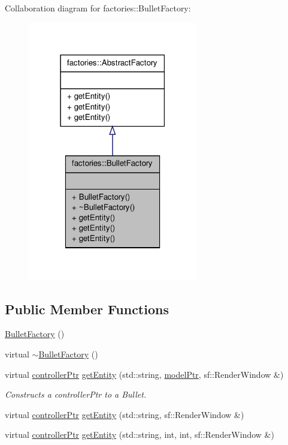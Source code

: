 \-Collaboration diagram for factories\-:\-:\-Bullet\-Factory\-:\nopagebreak
\begin{figure}[H]
\begin{center}
\leavevmode
\includegraphics[width=210pt]{da/ddc/classfactories_1_1BulletFactory__coll__graph}
\end{center}
\end{figure}
\subsection*{\-Public \-Member \-Functions}
\begin{DoxyCompactItemize}
\item 
\hyperlink{classfactories_1_1BulletFactory_a5af74b507fc4f0fe39fb94efbf159a5c}{\-Bullet\-Factory} ()
\item 
virtual \hyperlink{classfactories_1_1BulletFactory_a789745f38774d8a97593881eb3f42405}{$\sim$\-Bullet\-Factory} ()
\item 
virtual \hyperlink{Game_8h_a21b04f6cf2d5990b82725fac5ea2ce9a}{controller\-Ptr} \hyperlink{classfactories_1_1BulletFactory_a52d80d4c23a55808219029ae7ad898a4}{get\-Entity} (std\-::string, \hyperlink{ModelView_8h_a78966ddb517fca8d2b29a2bc5c31e74e}{model\-Ptr}, sf\-::\-Render\-Window \&)
\begin{DoxyCompactList}\small\item\em \-Constructs a controller\-Ptr to a \-Bullet. \end{DoxyCompactList}\item 
virtual \hyperlink{Game_8h_a21b04f6cf2d5990b82725fac5ea2ce9a}{controller\-Ptr} \hyperlink{classfactories_1_1BulletFactory_ab04bbad8513b1ddb8045c89885a2fa8e}{get\-Entity} (std\-::string, sf\-::\-Render\-Window \&)
\item 
virtual \hyperlink{Game_8h_a21b04f6cf2d5990b82725fac5ea2ce9a}{controller\-Ptr} \hyperlink{classfactories_1_1BulletFactory_a1e8e14ec9380341eb3522d60fdaf659e}{get\-Entity} (std\-::string, int, int, sf\-::\-Render\-Window \&)
\end{DoxyCompactItemize}


